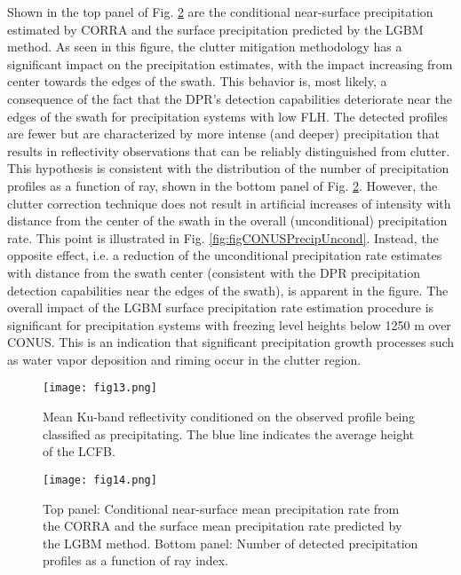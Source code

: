 \documentclass{ametsocV6.1} %
\begin{document}
Shown in the top panel of Fig. \ref{fig:figCONUSPrecipCond} are the conditional near-surface precipitation estimated by CORRA and the surface precipitation predicted by the LGBM method. As seen in this figure, the clutter mitigation methodology has a significant impact on the precipitation estimates, with the impact increasing from center towards the edges of the swath.  This behavior is, most likely, a consequence of the fact that the DPR's detection capabilities deteriorate near the edges of the swath for precipitation systems with low FLH. The detected profiles are fewer but are characterized by more intense (and deeper) precipitation that results in reflectivity observations that can be reliably distinguished from clutter. This hypothesis is consistent with the distribution of the number of precipitation profiles as a function of ray, shown in the bottom panel of Fig. \ref{fig:figCONUSPrecipCond}.  However, the clutter correction technique does not result in artificial increases of intensity with distance from the center of the swath in the overall (unconditional) precipitation rate.  This point is illustrated in Fig. \ref{fig:figCONUSPrecipUncond}.  Instead, the opposite effect, i.e. a reduction of the unconditional precipitation rate estimates with distance from the swath center (consistent with the DPR precipitation detection capabilities near the edges of the swath), is apparent in the figure.  The overall impact of the LGBM surface precipitation rate estimation procedure is significant for precipitation systems with freezing level heights below 1250 m over CONUS.  This is an indication that significant precipitation growth processes such as water vapor deposition and riming occur in the clutter region.  

\begin{center}
\begin{figure}
\texttt{[image: fig13.png]}
 \caption{Mean Ku-band reflectivity conditioned on the observed profile being classified as precipitating. The blue line indicates the average height of the LCFB.}
\label{fig:figCONUS_zMeas}
\end{figure}
\end{center}

\begin{center}
\begin{figure}
\begin{center}
\texttt{[image: fig14.png]}
 \caption{Top panel: Conditional near-surface mean precipitation rate from the CORRA and the surface mean precipitation rate predicted by the LGBM method. Bottom panel: Number of detected precipitation profiles as a function of ray index.}
\label{fig:figCONUSPrecipCond}
\end{center}
\end{figure}
\end{center}
\end{document}

